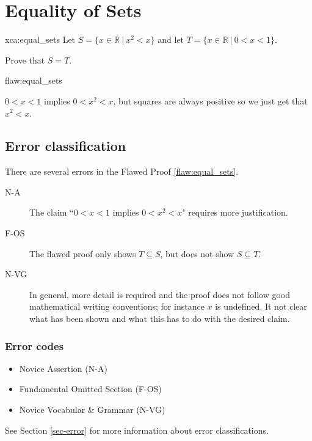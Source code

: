 \section{Equality of Sets}

\begin{xca}{xca:equal_sets}
Let $S = \{x \in \mathbb{R} \: | \: x^2 < x\}$ and let $T = \{x \in \mathbb{R} \: | \: 0 < x < 1\}$. 

\noindent Prove that $S = T$.
\end{xca}

\begin{flaw}{flaw:equal_sets} 

$0 < x < 1$ implies $0 < x^2 < x$, but squares are always positive so we just get that $x^2 < x$.
\end{flaw}

\clearpage
\subsection{Error classification}


There are several errors
 in the Flawed Proof \ref{flaw:equal_sets}.

 \begin{description}
    \item[N-A] The claim ``$0 < x < 1$ implies $0 < x^2 < x$" requires more justification.
    \item[F-OS] The flawed proof only shows $T \subseteq S$, but does not show $S \subseteq T$.
    \item[N-VG] In general, more detail is required and the proof does not follow good mathematical writing conventions; for instance $x$ is undefined.  It not clear what has been shown and what this has to do with the desired claim.
 \end{description}


\subsubsection{Error codes}
\begin{itemize}
	\item Novice Assertion (N-A)
	\item Fundamental Omitted Section (F-OS)
	\item Novice Vocabular \& Grammar (N-VG)
\end{itemize}
See Section \ref{sec-error} for more information about error classifications.

